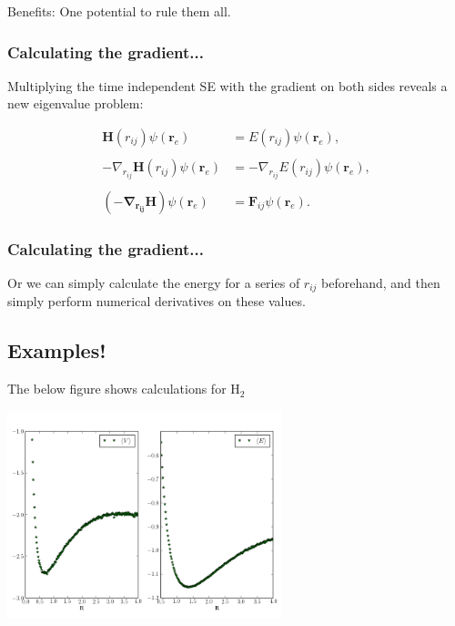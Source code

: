 \documentclass[
paper=128mm:96mm, %
fontsize=11pt, %
pagesize, %
parskip=half-, %
]{scrartcl} %
\theoremstyle{mythmstyle} %
\begin{document}
Benefits: One potential to rule them all.

\clearpage



\subsubsection*{Calculating the gradient...}

Multiplying the time independent SE with the gradient on both sides reveals a new eigenvalue problem:

\begin{align*}
 \mathbf{H}(r_{ij})\psi(\mathbf{r}_e) &= E(r_{ij})\psi(\mathbf{r}_e),\\
 & \\
  -\nabla_{r_{ij}}\mathbf{H}(r_{ij})\psi(\mathbf{r}_e) &=  -\nabla_{r_{ij}}E(r_{ij})\psi(\mathbf{r}_e),\\
  & \\
  \left(\mathbf{-\nabla_{r_{ij}} H}\right) \psi(\mathbf{r}_e) &= \mathbf{F}_{ij} \psi(\mathbf{r}_e).
\end{align*}



\clearpage

\subsubsection*{Calculating the gradient...}

Or we can simply calculate the energy for a series of $r_{ij}$ beforehand, and then simply perform numerical derivatives on these values.

\clearpage

\subsection{Examples!}

\clearpage


The below figure shows calculations for $\mathrm{H}_2$

\begin{center}
 \includegraphics[width=0.6\textwidth]{R_vs_E_hyd_pure}
\end{center}
\end{document}

